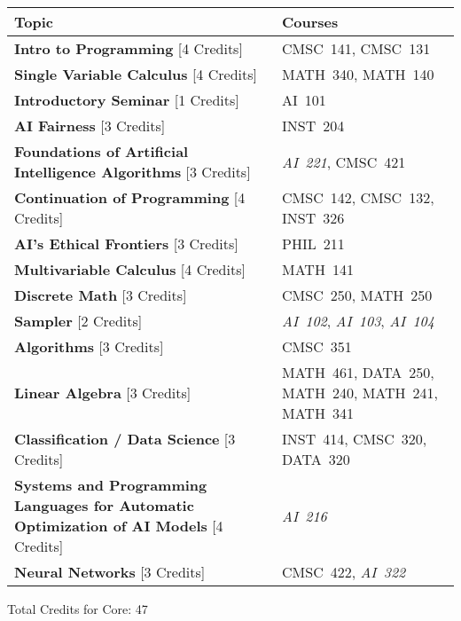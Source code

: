 \begin{longtable}{p{7cm}>{\raggedleft\arraybackslash}p{7cm}}
Topic & Courses \\
\toprule
\textbf{Intro to Programming} [4 Credits] & CMSC~141, CMSC~131             \\
\textbf{Single Variable Calculus} [4 Credits] & MATH~340, MATH~140         \\
\textbf{Introductory Seminar} [1 Credits] & AI~101                         \\
\textbf{AI Fairness} [3 Credits] & INST~204                                \\
\textbf{Foundations of Artificial Intelligence Algorithms} [3 Credits] & \textit{AI~221}, CMSC~421 \\
\textbf{Continuation of Programming} [4 Credits] & CMSC~142, CMSC~132, INST~326 \\
\textbf{AI's Ethical Frontiers} [3 Credits] & PHIL~211                     \\
\textbf{Multivariable Calculus} [4 Credits] & MATH~141                     \\
\textbf{Discrete Math} [3 Credits] & CMSC~250, MATH~250                    \\
\textbf{Sampler} [2 Credits] & \textit{AI~102}, \textit{AI~103}, \textit{AI~104} \\
\textbf{Algorithms} [3 Credits] & CMSC~351                                 \\
\textbf{Linear Algebra} [3 Credits] & MATH~461, DATA~250, MATH~240, MATH~241, MATH~341 \\
\textbf{Classification / Data Science} [3 Credits] & INST~414, CMSC~320, DATA~320 \\
\textbf{Systems and Programming Languages for Automatic Optimization of AI Models} [4 Credits] & \textit{AI~216} \\
\textbf{Neural Networks} [3 Credits] & CMSC~422, \textit{AI~322}           \\
\bottomrule
\end{longtable}
Total Credits for Core: 47
